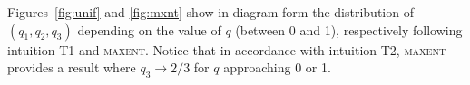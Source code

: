 \documentclass[12pt]{article}
\begin{document}



Figures~\ref{fig:unif} and \ref{fig:mxnt} show in diagram form the
distribution of $(q_{1},q_{2},q_{3})$ depending on the value of $q$
(between 0 and 1), respectively following intuition T1 and
\textsc{maxent}. Notice that in accordance with intuition T2,
\textsc{maxent} provides a result where $q_{3}\rightarrow{}2/3$ for
$q$ approaching 0 or 1.
\end{document}
